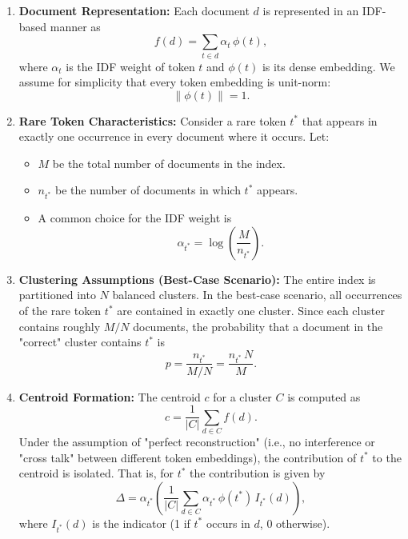 \documentclass[sigconf,review]{acmart}
\begin{document}
\begin{enumerate}
\item \textbf{Document Representation:} Each document $d$ is represented in an IDF-based manner as
\begin{equation}
f(d) = \sum_{t\in d} \alpha_t\, \phi(t),
\end{equation}
where $\alpha_t$ is the IDF weight of token $t$ and $\phi(t)$ is its dense embedding. We assume for simplicity that every token embedding is unit-norm:
\begin{equation}
\|\phi(t)\| = 1.
\end{equation}

\item \textbf{Rare Token Characteristics:} Consider a rare token $t^*$ that appears in exactly one occurrence in every document where it occurs. Let:
\begin{itemize}
\item $M$ be the total number of documents in the index.
\item $n_{t^*}$ be the number of documents in which $t^*$ appears.
\item A common choice for the IDF weight is
\begin{equation}
\alpha_{t^*} = \log\!\left(\frac{M}{n_{t^*}}\right).
\end{equation}
\end{itemize}

\item \textbf{Clustering Assumptions (Best-Case Scenario):} The entire index is partitioned into $N$ balanced clusters. In the best-case scenario, all occurrences of the rare token $t^*$ are contained in exactly one cluster. Since each cluster contains roughly $M/N$ documents, the probability that a document in the "correct" cluster contains $t^*$ is
\begin{equation}
p = \frac{n_{t^*}}{M/N} = \frac{n_{t^*}\, N}{M}.
\end{equation}

\item \textbf{Centroid Formation:} The centroid $c$ for a cluster $C$ is computed as
\begin{equation}
c = \frac{1}{|C|}\sum_{d\in C} f(d).
\end{equation}
Under the assumption of "perfect reconstruction" (i.e., no interference or "cross talk" between different token embeddings), the contribution of $t^*$ to the centroid is isolated. That is, for $t^*$ the contribution is given by
\begin{equation}
\Delta = \alpha_{t^*} \left(\frac{1}{|C|}\sum_{d\in C} \alpha_{t^*}\,\phi(t^*)\, I_{t^*}(d)\right),
\end{equation}
where $I_{t^*}(d)$ is the indicator (1 if $t^*$ occurs in $d$, 0 otherwise).


\end{enumerate}
\end{document}
